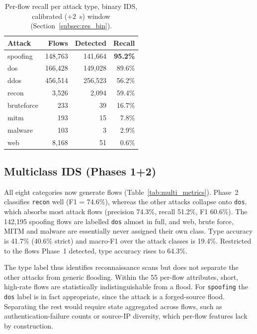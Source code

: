 \documentclass[conference]{IEEEtran}
\begin{document}
\begin{table}[t]
\centering
\caption{Per-flow recall per attack type, binary IDS, calibrated ($+2$~s) window (Section~\ref{subsec:res_bin}).}
\label{tab:detection_rate}
\footnotesize
\begin{tabular}{@{}lrrr@{}}
\toprule
\textbf{Attack} & \textbf{Flows} & \textbf{Detected} & \textbf{Recall} \\ \midrule
spoofing          & 148{,}763 & 141{,}664 & \textbf{95.2\%} \\
dos               & 166{,}428 & 149{,}028 & 89.6\% \\
ddos              & 456{,}514 & 256{,}523 & 56.2\% \\
recon             &   3{,}526 &   2{,}094 & 59.4\% \\
bruteforce        &      233 &      39 & 16.7\% \\
mitm              &      193 &      15 & 7.8\% \\
malware           &      103 &       3 & 2.9\% \\
web               &   8{,}168 &      51 & 0.6\% \\ \bottomrule
\end{tabular}
\end{table}

\subsection{Multiclass IDS (Phases 1+2)}
\label{subsec:res_multi}

All eight categories now generate flows (Table~\ref{tab:multi_metrics}). Phase~2 classifies \texttt{recon} well (F1 = 74.6\%), whereas the other attacks collapse onto \texttt{dos}, which absorbs most attack flows (precision 74.3\%, recall 51.2\%, F1 60.6\%). The 142{,}195 spoofing flows are labelled \texttt{dos} almost in full, and web, brute force, MITM and malware are essentially never assigned their own class. Type accuracy is 41.7\% (40.6\% strict) and macro-F1 over the attack classes is 19.4\%. Restricted to the flows Phase~1 detected, type accuracy rises to 64.3\%.

The type label thus identifies reconnaissance scans but does not separate the other attacks from generic flooding. Within the 55 per-flow attributes, short, high-rate flows are statistically indistinguishable from a flood. For \texttt{spoofing} the \texttt{dos} label is in fact appropriate, since the attack is a forged-source flood. Separating the rest would require state aggregated across flows, such as authentication-failure counts or source-IP diversity, which per-flow features lack by construction.
\end{document}
